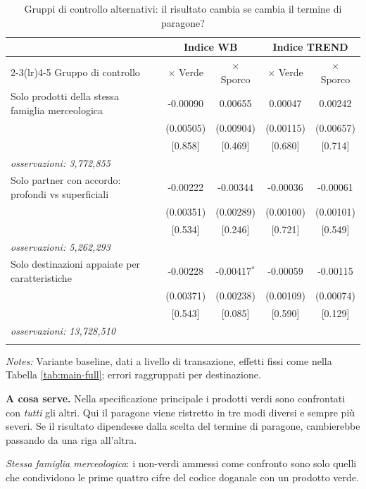 \begin{table}[htbp]
\centering
\footnotesize
\caption{Gruppi di controllo alternativi: il risultato cambia se cambia il termine di paragone?}
\label{tab:stability}
\begin{threeparttable}
\begin{tabular}{lcccc}
\toprule
 & \multicolumn{2}{c}{Indice WB} & \multicolumn{2}{c}{Indice TREND} \\
\cmidrule(lr){2-3}\cmidrule(lr){4-5}
Gruppo di controllo & $\times$ Verde & $\times$ Sporco & $\times$ Verde & $\times$ Sporco \\
\midrule
Solo prodotti della stessa famiglia merceologica & -0.00090 & 0.00655 & 0.00047 & 0.00242 \\
 & (0.00505) & (0.00904) & (0.00115) & (0.00657) \\
 & [0.858] & [0.469] & [0.680] & [0.714] \\
\quad \textit{osservazioni: 3,772,855} & & & & \\
\addlinespace
Solo partner con accordo: profondi vs superficiali & -0.00222 & -0.00344 & -0.00036 & -0.00061 \\
 & (0.00351) & (0.00289) & (0.00100) & (0.00101) \\
 & [0.534] & [0.246] & [0.721] & [0.549] \\
\quad \textit{osservazioni: 5,262,293} & & & & \\
\addlinespace
Solo destinazioni appaiate per caratteristiche & -0.00228 & -0.00417$^{*}$ & -0.00059 & -0.00115 \\
 & (0.00371) & (0.00238) & (0.00109) & (0.00074) \\
 & [0.543] & [0.085] & [0.590] & [0.129] \\
\quad \textit{osservazioni: 13,728,510} & & & & \\
\addlinespace
\bottomrule
\end{tabular}
\begin{tablenotes}[flushleft]\footnotesize
\item \emph{Notes:} Variante baseline, dati a livello di transazione, effetti fissi come nella Tabella \ref{tab:main-full}; errori raggruppati per destinazione.
\item \textbf{A cosa serve.} Nella specificazione principale i prodotti verdi sono confrontati con \emph{tutti} gli altri. Qui il paragone viene ristretto in tre modi diversi e sempre pi\`u severi. Se il risultato dipendesse dalla scelta del termine di paragone, cambierebbe passando da una riga all'altra.
\item \textit{Stessa famiglia merceologica}: i non-verdi ammessi come confronto sono solo quelli che condividono le prime quattro cifre del codice doganale con un prodotto verde.

\end{tablenotes}
\end{threeparttable}
\end{table}
